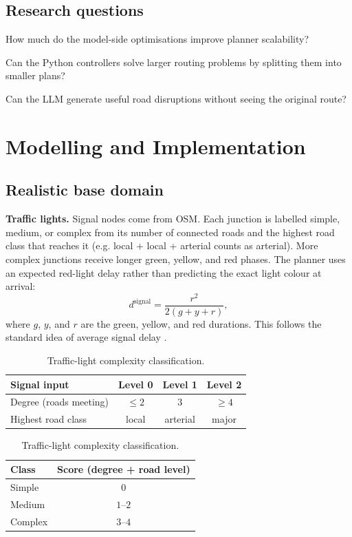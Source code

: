 \documentclass[10pt]{article}
\begin{document}
\subsection{Research questions}
\begin{description}[leftmargin=1.05cm,labelwidth=0.85cm,itemsep=0.10em,topsep=0.05em]

  \item[\textbf{RQ1}] How much do the model-side optimisations improve planner scalability?

  \item[\textbf{RQ2}] Can the Python controllers solve larger routing problems by splitting them into smaller plans?

  \item[\textbf{RQ3}] Can the LLM generate useful road disruptions without seeing the original route?

\end{description}

\section{Modelling and Implementation}

\subsection{Realistic base domain}
\textbf{Traffic lights.} Signal nodes come from OSM. Each junction is labelled simple, medium, or complex from its number
of connected roads and the highest road class that reaches it (e.g. local + local + arterial counts as arterial). More complex
junctions receive longer green, yellow, and red phases. The planner uses an
expected red-light delay rather than predicting the exact light colour at
arrival:
\[
 d^{\mathrm{signal}}=\frac{r^2}{2(g+y+r)},
\]
where $g$, $y$, and $r$ are the green, yellow, and red durations. This follows
the standard idea of average signal delay \cite{webster1958}.

\begin{table}[H]
\centering
\caption{Traffic-light complexity classification.}
\label{tab:traffic-light-complexity}
\small

\begin{tabular}{@{}lccc@{}}
\toprule
Signal input & Level 0 & Level 1 & Level 2 \\
\midrule
Degree (roads meeting) & $\leq 2$ & $3$ & $\geq 4$ \\
Highest road class & local & arterial & major \\
\bottomrule
\end{tabular}
\qquad
\begin{tabular}{@{}lc@{}}
\toprule
Class & Score (degree + road level) \\
\midrule
Simple & $0$ \\
Medium & $1$--$2$ \\
Complex & $3$--$4$ \\
\bottomrule
\end{tabular}

\end{table}
\end{document}
